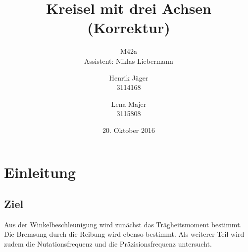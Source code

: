 \documentclass[12pt,a4paper,]{scrreprt}
\begin{document}
\title{Kreisel mit drei Achsen \\ (Korrektur)}
\author{Henrik Jäger \\ 3114168 \and Lena Majer \\ 3115808}
\subtitle{M42a \\  Assistent: Niklas Liebermann}
\subject{Physikalisches Praktikum I}
\publishers{Universität Stuttgart}
\date{20. Oktober 2016}

\maketitle%

\tableofcontents   %
\pagebreak

\chapter{Einleitung}
\section{Ziel}
Aus der Winkelbeschleunigung wird zunächst das Trägheitsmoment bestimmt. Die Bremsung durch die Reibung wird ebenso bestimmt. Als weiterer Teil wird zudem die Nutationsfrequenz und die Präzisionsfrequenz untersucht. 
\end{document}
